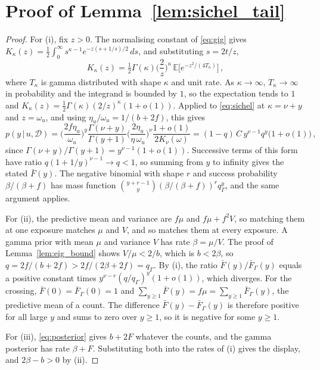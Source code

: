 \documentclass[twoside]{article}
\newcommand\given[1][]{\,#1\vert\,}
\theoremstyle{plain}
\theoremstyle{definition}
\theoremstyle{remark}
\begin{document}
\section{Proof of Lemma~\ref{lem:sichel_tail}}
\label{appx:sichel_tail}

\begin{proof}
    For (i), fix $z > 0$. The normalising constant of \eqref{eq:gig} gives $K_{\kappa}(z) = \tfrac{1}{2} \int_{0}^{\infty} s^{\kappa - 1} e^{-z(s + 1/s)/2} \, ds$, and substituting $s = 2t/z$,
    \begin{equation*}
        K_{\kappa}(z) = \tfrac{1}{2} \Gamma(\kappa) \Big( \frac{2}{z} \Big)^{\kappa} \, \mathbb{E}\big[ e^{-z^{2} / (4 T_{\kappa})} \big] \,,
    \end{equation*}
    where $T_{\kappa}$ is gamma distributed with shape $\kappa$ and unit rate.
    As $\kappa \to \infty$, $T_{\kappa} \to \infty$ in probability and the integrand is bounded by $1$, so the expectation tends to $1$ and $K_{\kappa}(z) = \tfrac{1}{2} \Gamma(\kappa) (2/z)^{\kappa} (1 + o(1))$.
    Applied to \eqref{eq:sichel} at $\kappa = \nu + y$ and $z = \omega_u$, and using $\eta_u / \omega_u = 1/(b + 2f)$, this gives
    \begin{equation*}
        p(y \given u, \mathcal{D}) = \Big( \frac{2 f \eta_u}{\omega_u} \Big)^{y} \frac{\Gamma(\nu + y)}{\Gamma(y + 1)} \Big( \frac{2 \eta_u}{\eta \, \omega_u} \Big)^{\nu} \frac{1 + o(1)}{2 K_{\nu}(\omega)}
        = (1 - q) \, C \, y^{\nu - 1} q^{y} \big(1 + o(1)\big) \,,
    \end{equation*}
    since $\Gamma(\nu + y) / \Gamma(y + 1) = y^{\nu - 1}(1 + o(1))$.
    Successive terms of this form have ratio $q (1 + 1/y)^{\nu - 1} \to q < 1$, so summing from $y$ to infinity gives the stated $\bar{F}(y)$.
    The negative binomial with shape $r$ and success probability $\beta / (\beta + f)$ has mass function $\binom{y + r - 1}{y} (\beta/(\beta + f))^{r} q_{\Gamma}^{y}$, and the same argument applies.

    For (ii), the predictive mean and variance are $f \mu$ and $f \mu + f^{2} V$, so matching them at one exposure matches $\mu$ and $V$, and so matches them at every exposure.
    A gamma prior with mean $\mu$ and variance $V$ has rate $\beta = \mu / V$.
    The proof of Lemma~\ref{lem:eig_bound} shows $V / \mu < 2 / b$, which is $b < 2 \beta$, so $q = 2f/(b + 2f) > 2f/(2\beta + 2f) = q_{\Gamma}$.
    By (i), the ratio $\bar{F}(y) / \bar{F}_{\Gamma}(y)$ equals a positive constant times $y^{\nu - r} (q / q_{\Gamma})^{y} (1 + o(1))$, which diverges.
    For the crossing, $\bar{F}(0) = \bar{F}_{\Gamma}(0) = 1$ and $\sum_{y \geq 1} \bar{F}(y) = f \mu = \sum_{y \geq 1} \bar{F}_{\Gamma}(y)$, the predictive mean of a count.
    The difference $\bar{F}(y) - \bar{F}_{\Gamma}(y)$ is therefore positive for all large $y$ and sums to zero over $y \geq 1$, so it is negative for some $y \geq 1$.

    For (iii), \eqref{eq:posterior} gives $b + 2F$ whatever the counts, and the gamma posterior has rate $\beta + F$.
    Substituting both into the rates of (i) gives the display, and $2\beta - b > 0$ by (ii).
\end{proof}
\end{document}
